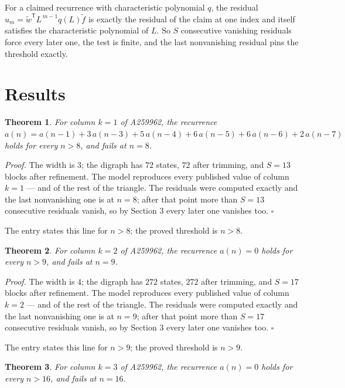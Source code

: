 \documentclass[11pt]{article}
\newtheorem{theorem}{Theorem}
\theoremstyle{definition}
\begin{document}
For a claimed recurrence with characteristic polynomial $q$, the residual $u_m = \tilde w^{\mathsf T}L^{\,m-1}q(L)\tilde f$ is exactly the residual of the claim at one index and itself satisfies the characteristic polynomial of $L$. So $S$ consecutive vanishing residuals force every later one, the test is finite, and the last nonvanishing residual pins the threshold exactly.

\section{Results}

\begin{theorem} For column $k = 1$ of A259962, the recurrence $a(n) = a(n-1) + 3\,a(n-3) + 5\,a(n-4) + 6\,a(n-5) + 6\,a(n-6) + 2\,a(n-7)$ holds for every $n > 8$, and fails at $n = 8$.\end{theorem}

{\itshape Proof.} The width is $3$; the digraph has $72$ states, $72$ after trimming, and $S = 13$ blocks after refinement. The model reproduces every published value of column $k = 1$ --- and of the rest of the triangle. The residuals were computed exactly and the last nonvanishing one is at $n = 8$; after that point more than $S = 13$ consecutive residuals vanish, so by Section 3 every later one vanishes too. $\square$

The entry states this line for $n > 8$; the proved threshold is $n > 8$.

\begin{theorem} For column $k = 2$ of A259962, the recurrence $a(n) = 0$ holds for every $n > 9$, and fails at $n = 9$.\end{theorem}

{\itshape Proof.} The width is $4$; the digraph has $272$ states, $272$ after trimming, and $S = 17$ blocks after refinement. The model reproduces every published value of column $k = 2$ --- and of the rest of the triangle. The residuals were computed exactly and the last nonvanishing one is at $n = 9$; after that point more than $S = 17$ consecutive residuals vanish, so by Section 3 every later one vanishes too. $\square$

The entry states this line for $n > 9$; the proved threshold is $n > 9$.

\begin{theorem} For column $k = 3$ of A259962, the recurrence $a(n) = 0$ holds for every $n > 16$, and fails at $n = 16$.\end{theorem}
\end{document}
